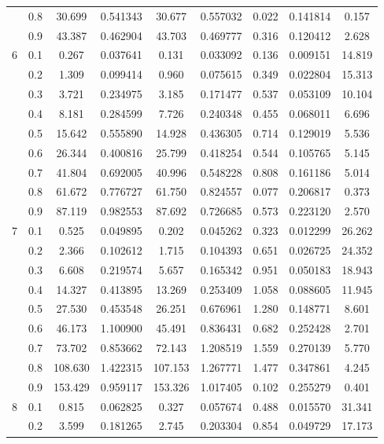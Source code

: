 \begin{longtable}{ | c | c || c | c | c | c | c | c | c | }
 & 0.8 & 30.699 & 0.541343 & 30.677 & 0.557032 & 0.022 & 0.141814 & 0.157 \\
 & 0.9 & 43.387 & 0.462904 & 43.703 & 0.469777 & 0.316 & 0.120412 & 2.628 \\
 \hline
\multirow{9}{*}{6} & 0.1 & 0.267 & 0.037641 & 0.131 & 0.033092 & 0.136 & 0.009151 & 14.819 \\
 & 0.2 & 1.309 & 0.099414 & 0.960 & 0.075615 & 0.349 & 0.022804 & 15.313 \\
 & 0.3 & 3.721 & 0.234975 & 3.185 & 0.171477 & 0.537 & 0.053109 & 10.104 \\
 & 0.4 & 8.181 & 0.284599 & 7.726 & 0.240348 & 0.455 & 0.068011 & 6.696 \\
 & 0.5 & 15.642 & 0.555890 & 14.928 & 0.436305 & 0.714 & 0.129019 & 5.536 \\
 & 0.6 & 26.344 & 0.400816 & 25.799 & 0.418254 & 0.544 & 0.105765 & 5.145 \\
 & 0.7 & 41.804 & 0.692005 & 40.996 & 0.548228 & 0.808 & 0.161186 & 5.014 \\
 & 0.8 & 61.672 & 0.776727 & 61.750 & 0.824557 & 0.077 & 0.206817 & 0.373 \\
 & 0.9 & 87.119 & 0.982553 & 87.692 & 0.726685 & 0.573 & 0.223120 & 2.570 \\
 \hline
\multirow{9}{*}{7} & 0.1 & 0.525 & 0.049895 & 0.202 & 0.045262 & 0.323 & 0.012299 & 26.262 \\
 & 0.2 & 2.366 & 0.102612 & 1.715 & 0.104393 & 0.651 & 0.026725 & 24.352 \\
 & 0.3 & 6.608 & 0.219574 & 5.657 & 0.165342 & 0.951 & 0.050183 & 18.943 \\
 & 0.4 & 14.327 & 0.413895 & 13.269 & 0.253409 & 1.058 & 0.088605 & 11.945 \\
 & 0.5 & 27.530 & 0.453548 & 26.251 & 0.676961 & 1.280 & 0.148771 & 8.601 \\
 & 0.6 & 46.173 & 1.100900 & 45.491 & 0.836431 & 0.682 & 0.252428 & 2.701 \\
 & 0.7 & 73.702 & 0.853662 & 72.143 & 1.208519 & 1.559 & 0.270139 & 5.770 \\
 & 0.8 & 108.630 & 1.422315 & 107.153 & 1.267771 & 1.477 & 0.347861 & 4.245 \\
 & 0.9 & 153.429 & 0.959117 & 153.326 & 1.017405 & 0.102 & 0.255279 & 0.401 \\
 \hline
\multirow{9}{*}{8} & 0.1 & 0.815 & 0.062825 & 0.327 & 0.057674 & 0.488 & 0.015570 & 31.341 \\
 & 0.2 & 3.599 & 0.181265 & 2.745 & 0.203304 & 0.854 & 0.049729 & 17.173 \\

\end{longtable}
